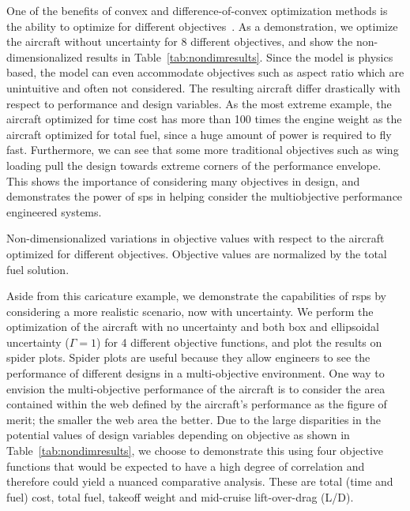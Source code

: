 One of the benefits of convex and difference-of-convex optimization methods is the ability to optimize for
different objectives~\cite{York2018}. As a demonstration, we optimize the aircraft without uncertainty
for 8 different objectives, and show
the non-dimensionalized results in Table~\ref{tab:nondimresults}.
Since the model is physics based, the model can even accommodate objectives such as aspect ratio
which are unintuitive and often not considered. The resulting aircraft
differ drastically with respect to performance and design variables.
As the most extreme example,
the aircraft optimized for time cost has more than 100 times the engine weight as the aircraft
optimized for total fuel, since a huge amount of power is required to fly fast. Furthermore, we can see
that some more traditional objectives such as wing loading pull the design
towards extreme corners of the performance envelope. This shows the importance of considering many objectives
in design, and demonstrates the power of \gls{sp}s in helping
consider the multiobjective performance engineered systems.

\begin{table}
\caption{Non-dimensionalized variations in objective values with respect to the aircraft optimized
for different objectives. Objective values are normalized by the total fuel solution.}
    \label{tab:nondimresults}
\end{table}

Aside from this caricature example, we demonstrate the capabilities of \gls{rsp}s
by considering a more realistic scenario, now with uncertainty.
We perform the optimization of the aircraft with no uncertainty and both box and
ellipsoidal uncertainty ($\Gamma = 1$)
for 4 different objective functions, and plot the results on spider plots.
Spider plots are useful because they allow engineers to see the performance of
different designs in a multi-objective
environment. One way to envision the multi-objective
performance of the aircraft is to consider the area contained within the web defined by the aircraft's
performance as the figure of merit; the smaller the web area the better.
Due to the large disparities in the potential values of design variables depending
on objective as shown in Table~\ref{tab:nondimresults}, we choose to demonstrate this using four objective functions
that would be expected to have a high degree of correlation and therefore could yield a
nuanced comparative analysis. These are
total (time and fuel) cost, total fuel, takeoff weight and mid-cruise lift-over-drag (L/D).

